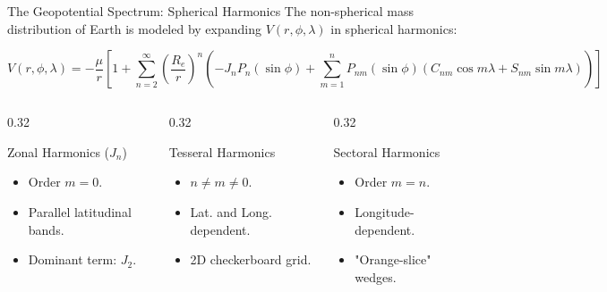 \documentclass[aspectratio=169,11pt]{beamer}
\begin{document}
\begin{frame}{The Geopotential Spectrum: Spherical Harmonics}
    The non-spherical mass distribution of Earth is modeled by expanding $V(r, \phi, \lambda)$ in spherical harmonics:

    {\small
    \begin{equation*}
        V(r,\phi,\lambda) = -\frac{\mu}{r} \left[ 1 + \sum_{n=2}^{\infty} \left( \frac{R_e}{r} \right)^n \left( -J_n P_n(\sin\phi) + \sum_{m=1}^{n} P_{nm}(\sin\phi) \left( C_{nm}\cos m\lambda + S_{nm}\sin m\lambda \right) \right) \right]
    \end{equation*}
    }

    \vspace{-0.2cm}

    \begin{columns}[t]
        \begin{column}{0.32\textwidth}
            \begin{block}{\small Zonal Harmonics ($J_n$)}
                \small
                \begin{itemize}
                    \item Order $m = 0$.
                    \item Parallel latitudinal bands.
                    \item Dominant term: $J_2$.
                \end{itemize}
            \end{block}
        \end{column}

        \begin{column}{0.32\textwidth}
            \begin{block}{\small Tesseral Harmonics}
                \small
                \begin{itemize}
                    \item $n \neq m \neq 0$.
                    \item Lat. and Long. dependent.
                    \item 2D checkerboard grid.
                \end{itemize}
            \end{block}
        \end{column}

        \begin{column}{0.32\textwidth}
            \begin{block}{\small Sectoral Harmonics}
                \small
                \begin{itemize}
                    \item Order $m = n$.
                    \item Longitude-dependent.
                    \item "Orange-slice" wedges.
                \end{itemize}
            \end{block}
        \end{column}
    \end{columns}
\end{frame}
\end{document}
